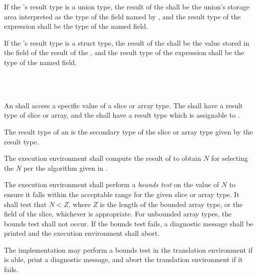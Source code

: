 \specsubitem
If the 's result type is a union type, the
result of the  shall be the union's storage
area interpreted as the type of the field named by , and the
result type of the expression shall be the type of the named field.

\specsubitem
If the 's result type is a struct type,
the result of the  shall be the value
stored in the  field of the result of the
, and the result type of the expression shall be
the type of the named field.


\begin{grammar}
 \\
	 \terminal{[}  \terminal{]} \\
\end{grammar}

\specsubsubitem
An  shall access a specific value of a slice
or array type. The  shall have a result type of
slice or array, and the  shall have a result
type which is assignable to .

\specsubsubitem
The result type of an  is the secondary type
of the slice or array type given by the  result
type.

\specsubsubitem
The execution environment shall compute the result of
 to obtain $N$ for selecting the \textit{N} per
the algorithm given in .

\specsubsubitem
The execution environment shall perform a \textit{bounds test} on the value of
$N$ to ensure it falls within the acceptable range for the given slice or array
type. It shall test that $N < Z$, where $Z$ is the length of the bounded array
type, or the  field of the slice, whichever is appropriate.  For
unbounded array types, the bounds test shall not occur. If the bounds test
fails, a diagnostic message shall be printed and the execution environment
shall abort.

The implementation may perform a bounds test in the translation environment if
is able, print a diagnostic message, and abort the translation environment if
it fails.

